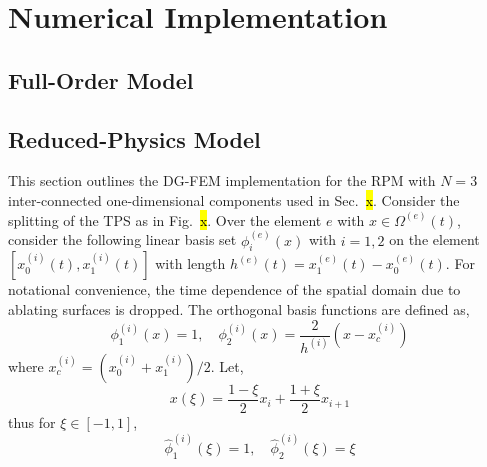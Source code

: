 \appendix

\section{Numerical Implementation}\label{app_implementation}

\subsection{Full-Order Model}

\subsection{Reduced-Physics Model}

This section outlines the DG-FEM implementation for the RPM with $N=3$ inter-connected one-dimensional components used in Sec.~\hl{x}. Consider the splitting of the TPS as in Fig.~\hl{x}. Over the element $e$ with $x\in\Omega^{(e)}(t)$, consider the following linear basis set $\phi_i^{(e)}(x)$ with $i=1,2$ on the element $[x^{(i)}_{0}(t),x^{(i)}_{1}(t)]$ with length $h^{(e)}(t)=x^{(e)}_{1}(t) - x^{(e)}_{0}(t)$. For notational convenience, the time dependence of the spatial domain due to ablating surfaces is dropped. The orthogonal basis functions are defined as,
\begin{equation}
    \phi^{(i)}_1(x) = 1,\quad \phi^{(i)}_2(x) = \frac{2}{h^{(i)}}\left(x - x^{(i)}_c\right)
\end{equation}
where $x^{(i)}_c = (x^{(i)}_0 + x^{(i)}_1) / 2$. Let,
\[
    x(\xi) = \frac{1-\xi}{2}x_i + \frac{1 + \xi}{2}x_{i+1}
\]
thus for $\xi\in[-1,1]$,
\begin{equation}
    \hat{\phi}^{(i)}_1(\xi) = 1, \quad \hat{\phi}^{(i)}_2(\xi) = \xi
\end{equation}

